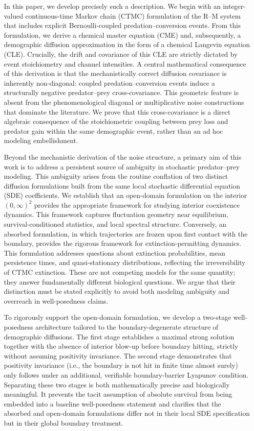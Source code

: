\documentclass[pdflatex,sn-mathphys-ay]{sn-jnl}
\theoremstyle{thmstyleone}
\theoremstyle{definition}
\theoremstyle{remark}
\begin{document}
In this paper, we develop precisely such a description. 
We begin with an integer-valued continuous-time Markov chain (CTMC) formulation of the R--M system that includes explicit Bernoulli-coupled predation--conversion events. From this formulation, we derive a chemical master equation (CME) and, subsequently, a demographic diffusion approximation in the form of a chemical Langevin equation (CLE).
Crucially, the drift and covariance of this CLE are strictly dictated by event stoichiometry and channel intensities. 
A central mathematical consequence of this derivation is that the mechanistically correct diffusion covariance is inherently non-diagonal: coupled predation--conversion events induce a structurally negative predator--prey cross-covariance.
This geometric feature is absent from the phenomenological diagonal or multiplicative noise constructions that dominate the literature.
We prove that this cross-covariance is a direct algebraic consequence of the stoichiometric coupling between prey loss and predator gain within the same demographic event, rather than an ad hoc modeling embellishment.

Beyond the mechanistic derivation of the noise structure, a primary aim of this work is to address a persistent source of ambiguity in stochastic predator--prey modeling. This ambiguity arises from the routine conflation of two distinct diffusion formulations built from the same local stochastic differential equation (SDE) coefficients. 
We establish that an open-domain formulation on the interior $(0,\infty)^2$ provides the appropriate framework for studying interior coexistence dynamics. This framework captures fluctuation geometry near equilibrium, survival-conditioned statistics, and local spectral structure. 
Conversely, an absorbed formulation, in which trajectories are frozen upon first contact with the boundary, provides the rigorous framework for extinction-permitting dynamics. 
This formulation addresses questions about extinction probabilities, mean persistence times, and quasi-stationary distributions, reflecting the irreversibility of CTMC extinction. 
These are not competing models for the same quantity; they answer fundamentally different biological questions. We argue that their distinction must be stated explicitly to avoid both modeling ambiguity and overreach in well-posedness claims.

To rigorously support the open-domain formulation, we develop a two-stage well-posedness architecture tailored to the boundary-degenerate structure of demographic diffusions. 
The first stage establishes a maximal strong solution together with the absence of interior blow-up before boundary hitting, strictly without assuming positivity invariance. 
The second stage demonstrates that positivity invariance (i.e., the boundary is not hit in finite time almost surely) only follows under an additional, verifiable boundary-barrier Lyapunov condition. 
Separating these two stages is both mathematically precise and biologically meaningful. 
It prevents the tacit assumption of absolute survival from being embedded into a baseline well-posedness statement and clarifies that the absorbed and open-domain formulations differ not in their local SDE specification but in their global boundary treatment.
\end{document}
